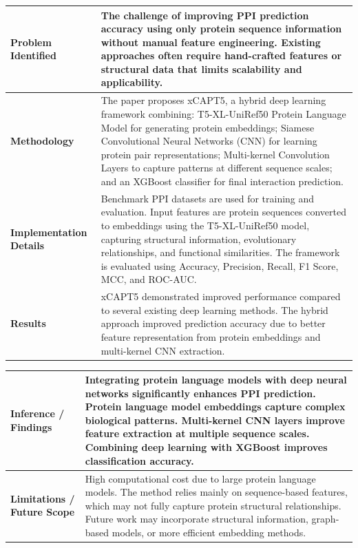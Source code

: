 \documentclass[12pt,a4paper]{report}
\begin{document}
\begin{table}[H]
\centering
\renewcommand{\arraystretch}{1.5}
\begin{tabular}{|p{}|p{}|}
\hline
\textbf{Problem Identified} & The challenge of improving PPI prediction accuracy using only protein sequence information without manual feature engineering. Existing approaches often require hand-crafted features or structural data that limits scalability and applicability. \\ \hline
\textbf{Methodology} & The paper proposes xCAPT5, a hybrid deep learning framework combining: T5-XL-UniRef50 Protein Language Model for generating protein embeddings; Siamese Convolutional Neural Networks (CNN) for learning protein pair representations; Multi-kernel Convolution Layers to capture patterns at different sequence scales; and an XGBoost classifier for final interaction prediction. \\ \hline
\textbf{Implementation Details} & Benchmark PPI datasets are used for training and evaluation. Input features are protein sequences converted to embeddings using the T5-XL-UniRef50 model, capturing structural information, evolutionary relationships, and functional similarities. The framework is evaluated using Accuracy, Precision, Recall, F1 Score, MCC, and ROC-AUC. \\ \hline
\textbf{Results} & xCAPT5 demonstrated improved performance compared to several existing deep learning methods. The hybrid approach improved prediction accuracy due to better feature representation from protein embeddings and multi-kernel CNN extraction. \\ \hline
\end{tabular}
\end{table}

\newpage

\begin{table}[H]
\centering
\renewcommand{\arraystretch}{1.5}
\begin{tabular}{|p{}|p{}|}
\hline
\textbf{Inference / Findings} & Integrating protein language models with deep neural networks significantly enhances PPI prediction. Protein language model embeddings capture complex biological patterns. Multi-kernel CNN layers improve feature extraction at multiple sequence scales. Combining deep learning with XGBoost improves classification accuracy. \\ \hline
\textbf{Limitations / Future Scope} & High computational cost due to large protein language models. The method relies mainly on sequence-based features, which may not fully capture protein structural relationships. Future work may incorporate structural information, graph-based models, or more efficient embedding methods. \\ \hline
\end{tabular}
\end{table}
\end{document}
